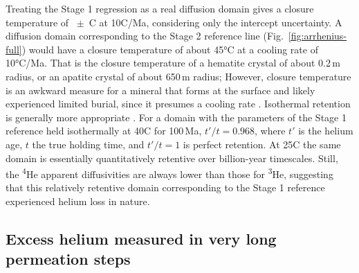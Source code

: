 Treating the Stage 1 regression as a real diffusion domain gives a closure temperature of \ChTwoTc\ $\pm$ \ChTwoTcErr\,\textdegree C at 10\textdegree C/Ma, considering only the intercept uncertainty. A diffusion domain corresponding to the Stage 2 reference line (Fig.~\ref{fig:arrhenius-full}) would have a closure temperature of about 45°C at a cooling rate of 10°C/Ma. That is the closure temperature of a hematite crystal of about 0.2\,\textmu m radius, or an apatite crystal of about 650\,\textmu m radius; However, closure temperature is an awkward measure for a mineral that forms at the surface and likely experienced limited burial, since it presumes a cooling rate \citep{dodson1973}. Isothermal retention is generally more appropriate \citep{wolf1998}. For a domain with the parameters of the Stage 1 reference held isothermally at 40\textdegree C for 100\,Ma, $t'/t = 0.968$, where $t'$ is the helium age, $t$ the true holding time, and $t'/t = 1$ is perfect retention. At 25\textdegree C the same domain is essentially quantitatively retentive over billion-year timescales. Still, the \textsuperscript{4}He apparent diffusivities are always lower than those for \textsuperscript{3}He, suggesting that this relatively retentive domain corresponding to the Stage 1 reference experienced helium loss in nature.

\subsection{Excess helium measured in very long permeation steps}\label{sec:discussion-permeation-excess}

